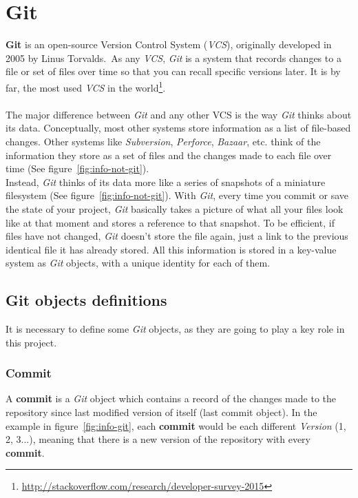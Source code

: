 \documentclass[a4paper, 12pt]{book}
\begin{document}
\section{Git}
\label{sec:git}
\textbf{Git} is an open-source Version Control System (\emph{VCS}), originally developed in 2005 by Linus Torvalds.\
As any \emph{VCS}, \emph{Git} is a system that records changes to a file or set of files over time
so that you can recall specific versions later.
It is by far, the most used \emph{VCS} in the world\footnote{\url{http://stackoverflow.com/research/developer-survey-2015}}.\\\\
The major difference between \emph{Git} and any other VCS is the way \emph{Git} thinks about its data.
Conceptually, most other systems store information as a list of file-based changes. Other systems like \textit{Subversion},
\textit{Perforce}, \textit{Bazaar}, etc. think of the information they store as a set of files and the changes made to each
file over time (See figure~\ref{fig:info-not-git}).\\
Instead, \emph{Git} thinks of its data more like a series of snapshots of a miniature filesystem (See figure~\ref{fig:info-not-git}).
With \emph{Git}, every time you commit or save the state of your project, \emph{Git} basically takes a picture of what all
your files look like at that moment and stores a reference to that snapshot. To be efficient, if files have not changed,
\emph{Git} doesn't store the file again, just a link to the previous identical file it has already stored.
All this information is stored in a key-value system as \emph{Git} objects, with a unique identity for each of them.
\subsection{Git objects definitions}
\label{ssec:git-definitions}
It is necessary to define some \emph{Git} objects, as they are going to play a key role in this project.
\subsubsection{Commit}
A \textbf{commit} is a \emph{Git} object which contains a record of the changes made to the repository since last modified
version of itself (last commit object). In the example in figure~\ref{fig:info-git}, each \textbf{commit} would be each different
\textit{Version} (1, 2, 3...), meaning that there is a new version of the repository with every \textbf{commit}.
\end{document}
